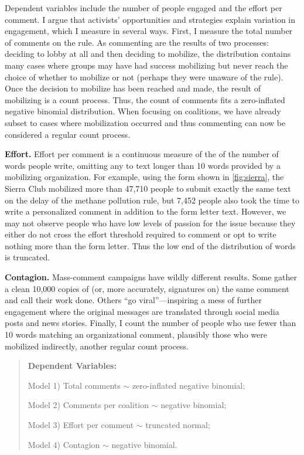 Dependent variables include the number of people engaged and the effort per comment.
I argue that activists' opportunities and strategies explain variation in engagement, which I measure in several ways. 
First, I measure the total number of comments on the rule. As commenting are the results of two processes: deciding to lobby at all and then deciding to mobilize, the distribution contains many cases where groups may have had success mobilizing but never reach the choice of whether to mobilize or not (perhaps they were unaware of the rule). Once the decision to mobilize has been reached and made, the result of mobilizing is a count process. Thus, the count of comments fits a zero-inflated negative binomial distribution. When focusing on coalitions, we have already subset to cases where mobilization occurred and thus commenting can now be considered a regular count process. 

\textbf{Effort.} Effort per comment is a continuous measure of the of the number of words people write, omitting any to text longer than 10 words provided by a mobilizing organization. %
For example, using the form shown in \ref{fig:sierra}, the Sierra Club mobilized more than 47,710 people to submit exactly the same text on the delay of the methane pollution rule, but 7,452 people also took the time to write a personalized comment in addition to the form letter text. However, we may not observe people who have low levels of passion for the issue because they either do not cross the effort threshold required to comment or opt to write nothing more than the form letter. Thus the low end of the distribution of words is truncated.

\textbf{Contagion.} Mass-comment campaigns have wildly different results. Some gather a clean 10,000 copies of (or, more accurately, signatures on) the same comment and call their work done. Others ``go viral''---inspiring a mess of further engagement where the original messages are translated through social media posts and news stories.
Finally, I count the number of people who use fewer than 10 words matching an organizational comment, plausibly those who were mobilized indirectly, another regular count process.

\begin{quote}
\textbf{Dependent Variables:} 

Model 1) Total comments $\sim$ zero-inflated negative binomial; 

Model 2) Comments per coalition $\sim$ negative binomial; 

Model 3) Effort per comment $\sim$ truncated normal; 

Model 4) Contagion $\sim$ negative binomial. 

\end{quote}


